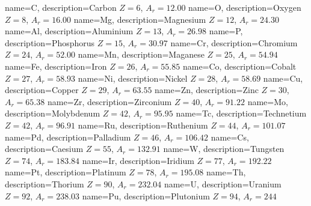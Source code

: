 {
    name=C,
    description={Carbon $Z = 6$, $A_r = 12.00$}
}
{
    name=O,
    description={Oxygen $Z = 8$, $A_r = 16.00$}
}
{
    name=Mg,
    description={Magnesium $Z = 12$, $A_r = 24.30$}
}
{
    name=Al,
    description={Aluminium $Z = 13$, $A_r = 26.98$}
}
{
    name=P,
    description={Phosphorus $Z = 15$, $A_r = 30.97$}
}
{
    name=Cr,
    description={Chromium $Z = 24$, $A_r = 52.00$}
}
{
    name=Mn,
    description={Maganese $Z = 25$, $A_r = 54.94$}
}
{
    name=Fe,
    description={Iron $Z = 26$, $A_r = 55.85$}
}
{
    name=Co,
    description={Cobalt $Z = 27$, $A_r = 58.93$}
}
{
    name=Ni,
    description={Nickel $Z = 28$, $A_r = 58.69$}
}
{
    name=Cu,
    description={Copper $Z = 29$, $A_r = 63.55$}
}
{
    name=Zn,
    description={Zinc $Z = 30$, $A_r = 65.38$}
}
{
    name=Zr,
    description={Zirconium $Z = 40$, $A_r = 91.22$}
}
{
    name=Mo,
    description={Molybdenum $Z = 42$, $A_r = 95.95$}
}
{
    name=Tc,
    description={Technetium $Z = 42$, $A_r = 96.91$}
}
{
    name=Ru,
    description={Ruthenium $Z = 44$, $A_r = 101.07$}
}
{
    name=Pd,
    description={Palladium $Z = 46$, $A_r = 106.42$}
}
{
    name=Cs,
    description={Caesium $Z = 55$, $A_r = 132.91$}
}
{
    name=W,
    description={Tungsten $Z = 74$, $A_r = 183.84$}
}
{
    name=Ir,
    description={Iridium $Z = 77$, $A_r = 192.22$}
}
{
    name=Pt,
    description={Platinum $Z = 78$, $A_r = 195.08$}
}
{
    name=Th,
    description={Thorium $Z = 90$, $A_r = 232.04$}
}
{
    name=U,
    description={Uranium $Z = 92$, $A_r = 238.03$}
}
{
    name=Pu,
    description={Plutonium $Z = 94$, $A_r = 244$}
}



